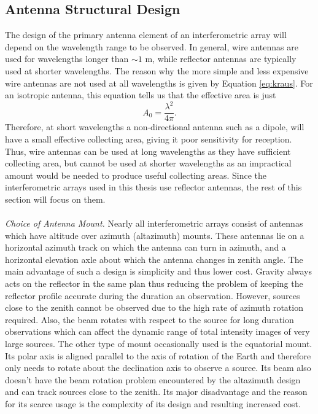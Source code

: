 \subsection{Antenna Structural Design}\label{subsec:2}
The design of the primary antenna element of an interferometric array will depend on the wavelength range to be observed. In general, wire antennas are used for wavelengths longer than $\sim 1$ m, while reflector antennas are typically used at shorter wavelengths. The reason why the more simple and less expensive wire antennas are not used at all wavelengths is given by Equation \ref{eq:kraus}. For an isotropic antenna, this equation tells us that the effective area is just
\begin{equation}
A_{0} = \frac{\lambda ^2}{4\pi}.
\end{equation}
Therefore, at short wavelengths a non-directional antenna such as a dipole, will have a small effective collecting area, giving it poor sensitivity for reception. Thus, wire antennas can be used at long wavelengths as they have sufficient collecting area, but cannot be used at shorter wavelengths as an impractical amount would be needed to produce useful collecting areas. Since the interferometric arrays used in this thesis use reflector antennas, the rest of this section will focus on them.\\
\\
\textit{Choice of Antenna Mount.} Nearly all interferometric arrays consist of antennas which have altitude over azimuth (altazimuth) mounts. These antennas lie on a horizontal azimuth track on which the antenna can turn in azimuth, and a horizontal elevation axle about which the antenna changes in zenith angle. The main advantage of such a design is simplicity and thus lower cost. Gravity always acts on the reflector in the same plan thus reducing the problem of keeping the reflector profile accurate during the duration an observation. However, sources close to the zenith cannot be observed due to the high rate of azimuth rotation required. Also, the beam rotates with respect to the source for long duration observations which can affect the dynamic range of total intensity images of very large sources. The other type of mount occasionally used is the equatorial mount. Its polar axis is aligned parallel to the axis of rotation of the Earth and therefore only needs to rotate about the declination axis to observe a source. Its beam also doesn't have the beam rotation problem encountered by the altazimuth design and can track sources close to the zenith. Its major disadvantage and the reason for its scarce usage is the complexity of its design and resulting increased cost. \\
